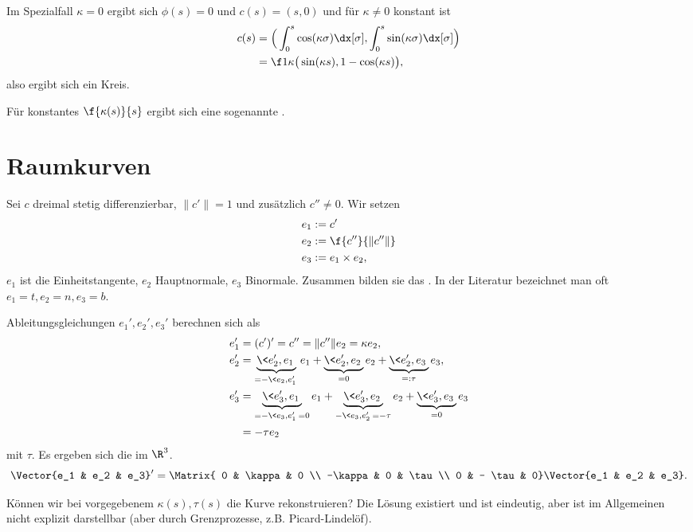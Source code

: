 Im Spezialfall $\kappa = 0$ ergibt sich $\phi(s) = 0$ und $c(s) = (s, 0)$ und für $\kappa \neq 0$ konstant ist
\begin{align*}
	c(s) &= \Big( \int_0^s \cos (\kappa \sigma) \dx[\sigma] , \int_0^s \sin(\kappa \sigma) \dx[\sigma] \Big) \\
	&= \f 1\kappa \big( \sin (\kappa s), 1 - \cos (\kappa s) \big),
\end{align*}
also ergibt sich ein Kreis.

Für konstantes $\f{\kappa(s)}{s}$ ergibt sich eine sogenannte .


\section{Raumkurven}

Sei $c$ dreimal stetig differenzierbar, $\|c'\| = 1$ und zusätzlich $c'' \neq 0$.
Wir setzen
\begin{align*}
	e_1 &:= c' \\
	e_2 &:= \f {c''}{\|c''\|} \\
	e_3 &:= e_1 \times e_2,
\end{align*}
$e_1$ ist die Einheitstangente, $e_2$ Hauptnormale, $e_3$ Binormale.
Zusammen bilden sie das .
In der Literatur bezeichnet man oft $e_1 = t, e_2 = n, e_3 = b$.

Ableitungsgleichungen $e_1', e_2', e_3'$ berechnen sich als
\begin{align*}
	e_1' &= (c')' = c'' = \|c''\| e_2 = \kappa e_2, \\
	e_2' &= \underbrace{\<e_2', e_1\>}_{=-\<e_2, e_1'\>} e_1 + \underbrace{\<e_2', e_2\>}_{=0} e_2 + \underbrace{\<e_2', e_3\>}_{=: \tau} e_3, \\
	e_3' &= \underbrace{\<e_3', e_1\>}_{=-\<e_3, e_1'\> = 0} e_1 + \underbrace{\<e_3', e_2\>}_{-\<e_3, e_2'\> = -\tau} e_2 + \underbrace{\< e_3', e_3 \>}_{=0} e_3 \\
	&= - \tau e_2
\end{align*}
mit  $\tau$.
Es ergeben sich die  im $\R^3$.
\[
	\Vector{e_1 & e_2 & e_3}'
	= \Matrix{ 0 & \kappa & 0 \\ -\kappa & 0 & \tau \\ 0 & - \tau & 0}
	\Vector{e_1 & e_2 & e_3}.
\]

Können wir bei vorgegebenem $\kappa(s), \tau(s)$ die Kurve rekonstruieren?
Die Lösung existiert und ist eindeutig, aber ist im Allgemeinen nicht explizit darstellbar (aber durch Grenzprozesse, z.B. Picard-Lindelöf).

